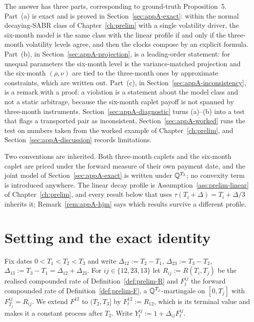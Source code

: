 \documentclass[../../main.tex]{subfiles}
\begin{document}
The answer has three parts, corresponding to ground-truth Proposition~5. Part~(a) is exact and is proved in Section~\ref{sec:appA-exact}: within the normal decaying-SABR class of Chapter~\ref{ch:prelim} with a single volatility driver, the six-month model is the same class with the linear profile if and only if the three-month volatility levels agree, and then the clocks compose by an explicit formula. Part~(b), in Section~\ref{sec:appA-projection}, is a leading-order statement: for unequal parameters the six-month level is the variance-matched projection and the six-month $(\rho,\nu)$ are tied to the three-month ones by approximate constraints, which are written out. Part~(c), in Section~\ref{sec:appA-inconsistency}, is a remark with a proof: a violation is a statement about the model class and not a static arbitrage, because the six-month caplet payoff is not spanned by three-month instruments. Section~\ref{sec:appA-diagnostic} turns (a)--(b) into a test that flags a transported pair as inconsistent, Section~\ref{sec:appA-worked} runs the test on numbers taken from the worked example of Chapter~\ref{ch:prelim}, and Section~\ref{sec:appA-discussion} records limitations.

Two conventions are inherited. Both three-month caplets and the six-month caplet are priced under the forward measure of their own payment date, and the joint model of Section~\ref{sec:appA-exact} is written under $\mathbb{Q}^{T_3}$; no convexity term is introduced anywhere. The linear decay profile is Assumption~\ref{ass:prelim-linear} of Chapter~\ref{ch:prelim}, and every result below that uses $\tau(T_i+\Delta)=T_i+\Delta/3$ inherits it; Remark~\ref{rem:appA-hjm} says which results survive a different profile.

\section{Setting and the exact identity}\label{sec:appA-identity}

Fix dates $0<T_1<T_2<T_3$ and write $\Delta_{12}:=T_2-T_1$, $\Delta_{23}:=T_3-T_2$, $\Delta_{13}:=T_3-T_1=\Delta_{12}+\Delta_{23}$. For $ij\in\{12,23,13\}$ let $R_{ij}:=R(T_i,T_j)$ be the realised compounded rate of Definition~\ref{def:prelim-R} and $F^{ij}_t$ the forward compounded rate of Definition~\ref{def:prelim-F}, a $\mathbb{Q}^{T_j}$-martingale on $[0,T_j]$ with $F^{ij}_{T_j}=R_{ij}$. We extend $F^{12}$ to $(T_2,T_3]$ by $F^{12}_t:=R_{12}$, which is its terminal value and makes it a constant process after $T_2$. Write $Y^{ij}_t:=1+\Delta_{ij}F^{ij}_t$.
\end{document}
